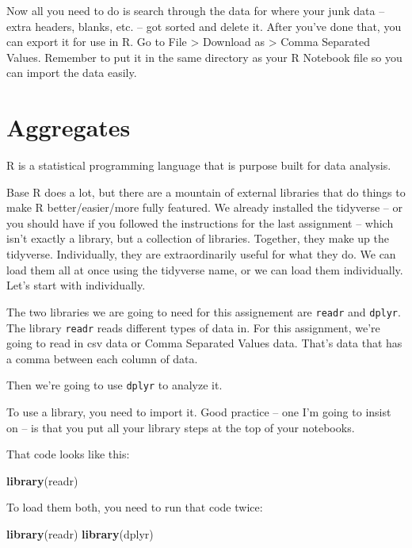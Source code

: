 \documentclass[]{book}
\newenvironment{Shaded}{\begin{snugshade}}{\end{snugshade}}
\newcommand{\KeywordTok}[1]{\textcolor[rgb]{0.13,0.29,0.53}{\textbf{#1}}}
\newcommand{\NormalTok}[1]{#1}
\begin{document}
Now all you need to do is search through the data for where your junk data -- extra headers, blanks, etc. -- got sorted and delete it. After you've done that, you can export it for use in R. Go to File \textgreater{} Download as \textgreater{} Comma Separated Values. Remember to put it in the same directory as your R Notebook file so you can import the data easily.

\hypertarget{aggregates}{%
\chapter{Aggregates}\label{aggregates}}

R is a statistical programming language that is purpose built for data analysis.

Base R does a lot, but there are a mountain of external libraries that do things to make R better/easier/more fully featured. We already installed the tidyverse -- or you should have if you followed the instructions for the last assignment -- which isn't exactly a library, but a collection of libraries. Together, they make up the tidyverse. Individually, they are extraordinarily useful for what they do. We can load them all at once using the tidyverse name, or we can load them individually. Let's start with individually.

The two libraries we are going to need for this assignement are \texttt{readr} and \texttt{dplyr}. The library \texttt{readr} reads different types of data in. For this assignment, we're going to read in csv data or Comma Separated Values data. That's data that has a comma between each column of data.

Then we're going to use \texttt{dplyr} to analyze it.

To use a library, you need to import it. Good practice -- one I'm going to insist on -- is that you put all your library steps at the top of your notebooks.

That code looks like this:

\begin{Shaded}
\begin{Highlighting}[]
\KeywordTok{library}\NormalTok{(readr)}
\end{Highlighting}
\end{Shaded}

To load them both, you need to run that code twice:

\begin{Shaded}
\begin{Highlighting}[]
\KeywordTok{library}\NormalTok{(readr)}
\KeywordTok{library}\NormalTok{(dplyr)}
\end{Highlighting}
\end{Shaded}
\end{document}
